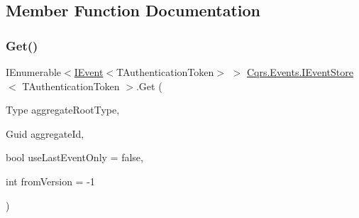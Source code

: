 \subsection{Member Function Documentation}
\mbox{\label{interfaceCqrs_1_1Events_1_1IEventStore_ae02ef6c804d0c4a92705a447bc4b2214_ae02ef6c804d0c4a92705a447bc4b2214}} 
\subsubsection{\texorpdfstring{Get()}{Get()}\hspace{0.1cm}{\footnotesize\ttfamily [1/2]}}
{\footnotesize\ttfamily I\+Enumerable$<$\hyperlink{interfaceCqrs_1_1Events_1_1IEvent}{I\+Event}$<$T\+Authentication\+Token$>$ $>$ \hyperlink{interfaceCqrs_1_1Events_1_1IEventStore}{Cqrs.\+Events.\+I\+Event\+Store}$<$ T\+Authentication\+Token $>$.Get (\begin{DoxyParamCaption}\item[{Type}]{aggregate\+Root\+Type,  }\item[{Guid}]{aggregate\+Id,  }\item[{bool}]{use\+Last\+Event\+Only = {\ttfamily false},  }\item[{int}]{from\+Version = {\ttfamily -\/1} }\end{DoxyParamCaption})}




